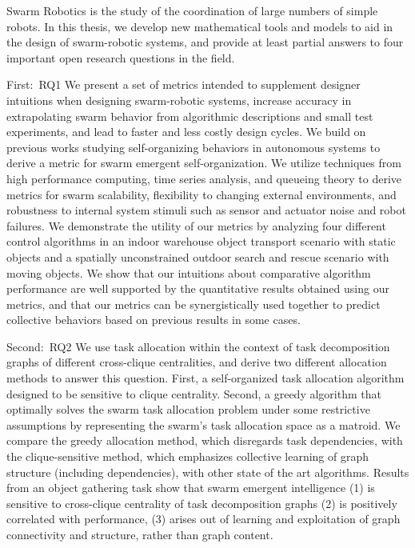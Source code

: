 
Swarm Robotics is the study of the coordination of large numbers of simple
robots. In this thesis, we develop new mathematical tools and models to aid in
the design of swarm-robotic systems, and provide at least partial answers to
four important open research questions in the field.

First:~\glsdesc{RQ1} We present a set of metrics intended to
supplement designer intuitions when designing swarm-robotic systems, increase
accuracy in extrapolating swarm behavior from algorithmic descriptions and small
test experiments, and lead to faster and less costly design cycles. We build on
previous works studying self-organizing behaviors in autonomous systems to
derive a metric for swarm emergent self-organization.  We utilize techniques
from high performance computing, time series analysis, and queueing theory to
derive metrics for swarm scalability, flexibility to changing external
environments, and robustness to internal system stimuli such as sensor and
actuator noise and robot failures.  We demonstrate the utility of our metrics by
analyzing four different control algorithms in an indoor warehouse object
transport scenario with static objects and a spatially unconstrained outdoor
search and rescue scenario with moving objects. We show that our intuitions
about comparative algorithm performance are well supported by the quantitative
results obtained using our metrics, and that our metrics can be synergistically
used together to predict collective behaviors based on previous results in some
cases.


Second:~\glsdesc{RQ2} We use task allocation within the context of task
decomposition graphs of different cross-clique centralities, and derive two
different allocation methods to answer this question. First, a self-organized
task allocation algorithm designed to be sensitive to clique centrality.
Second, a greedy algorithm that optimally solves the swarm task allocation
problem under some restrictive assumptions by representing the swarm's task
allocation space as a matroid. We compare the greedy allocation method, which
disregards task dependencies, with the clique-sensitive method, which emphasizes
collective learning of graph structure (including dependencies), with other
state of the art algorithms. Results from an object gathering task show that
swarm emergent intelligence (1) is sensitive to cross-clique centrality of task
decomposition graphs (2) is positively correlated with performance, (3) arises
out of learning and exploitation of graph connectivity and structure, rather
than graph content.

